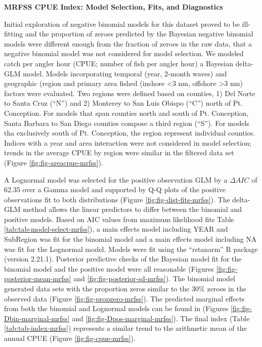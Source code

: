 \documentclass[
  english,
  a4paper,
]{article}
\begin{document}
\textbf{MRFSS CPUE Index: Model Selection, Fits, and Diagnostics}

Initial exploration of negative binomial models for this dataset proved to be
ill-fitting and the proportion of zeroes predicted by the Bayesian negative binomial
models were different enough from the fraction of zeroes in the raw data, that
a negative binomial model was not considered for model selection. We modeled catch
per angler hour (CPUE; number of fish per angler hour) a Bayesian delta-GLM model.
Models incorporating temporal (year, 2-month waves)
and geographic (region and primary area fished (inshore \textless3 nm, offshore \textgreater3 nm)
factors were evaluated. Two regions were defined based on counties, 1) Del Norte
to Santa Cruz (``N'') and 2) Monterey to San Luis Obispo (``C'') north of Pt. Conception.
For models that span counties north and south of Pt. Conception, Santa Barbara to
San Diego counties compose a third region (``S''). For models tha exclusively south
of Pt. Conception, the region represent individual counties. Indices with a year
and area interaction were not considered in model selection; trends in the average
CPUE by region were similar in the filtered data set (Figure \ref{fig:fig-areacpue-mrfss}).

A Lognormal model was
selected for the positive observation GLM by
a \(\Delta AIC\) of 62.35 over a Gamma model and supported by Q-Q plots of the positive observations fit to both distributions (Figure \ref{fig:fig-dist-fits-mrfss}). The delta-GLM
method allows the linear predictors to differ between the binomial and positive models.
Based on AIC values from maximum likelihood fits Table \ref{tab:tab-model-select-mrfss}),
a main effects model including
YEAR and SubRegion
was fit for the binomial model and a main
effects model including
NA
was fit for the Lognormal model.
Models were fit using the ``rstanarm'' R package (version 2.21.1). Posterior predictive
checks of the Bayesian model fit for the binomial model and the positive model
were all reasonable (Figures \ref{fig:fig-posterior-mean-mrfss} and
\ref{fig:fig-posterior-sd-mrfss}). The binomial model generated data sets with the
proportion zeros similar to the
30\%
zeroes in the observed data (Figure \ref{fig:fig-propzero-mrfss}).
The predicted marginal effects from both the binomial and Lognormal models
can be found in (Figures \ref{fig:fig-Dbin-marginal-mrfss} and
\ref{fig:fig-Dpos-marginal-mrfss}). The final index (Table \ref{tab:tab-index-mrfss})
represents a similar trend to the arithmetic mean of the annual CPUE (Figure \ref{fig:fig-cpue-mrfss}).
\end{document}
